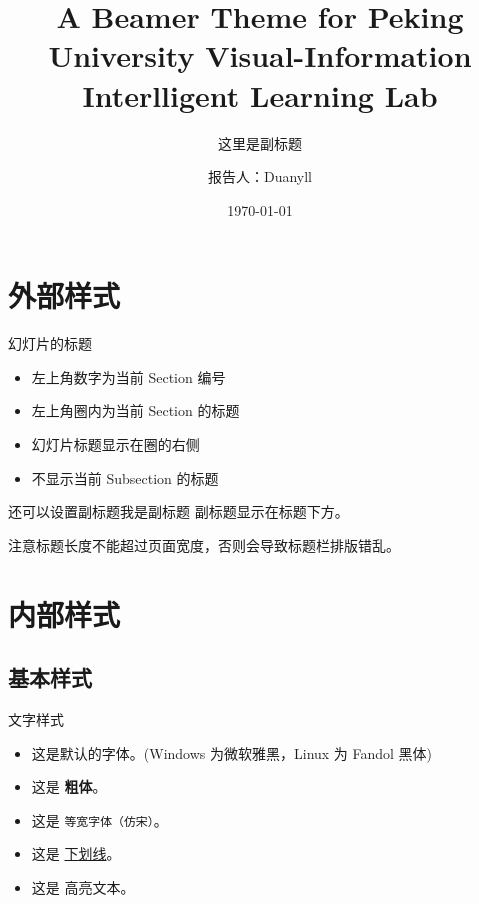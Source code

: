 \documentclass[aspectratio=169]{ctexbeamer}
\title[Villa Beamer Theme]{A Beamer Theme for Peking University Visual-Information Interlligent Learning Lab}
\subtitle{这里是副标题} %
\author[Duanyll]{报告人：Duanyll}
\date[\today]{\today}
\begin{document}
\begin{frame}
  \titlepage
\end{frame}

\begin{frame}
  \tableofcontents
\end{frame}

\section{外部样式}

\begin{frame}{幻灯片的标题}
  \begin{itemize}
    \item 左上角数字为当前 Section 编号
    \item 左上角圈内为当前 Section 的标题
    \item 幻灯片标题显示在圈的右侧
    \item 不显示当前 Subsection 的标题
  \end{itemize}
\end{frame}

\begin{frame}{还可以设置副标题}{我是副标题}
  副标题显示在标题下方。

  注意标题长度不能超过页面宽度，否则会导致标题栏排版错乱。
\end{frame}

\section{内部样式}

\subsection{基本样式}

\begin{frame}{文字样式}
  \begin{itemize}
    \item 这是默认的字体。(Windows 为微软雅黑，Linux 为 Fandol 黑体)
    \item 这是 \textbf{粗体}。
    \item 这是 \texttt{等宽字体（仿宋）}。
    \item 这是 \underline{下划线}。
    \item 这是 \alert{高亮文本}。
  \end{itemize}
\end{frame}
\end{document}

